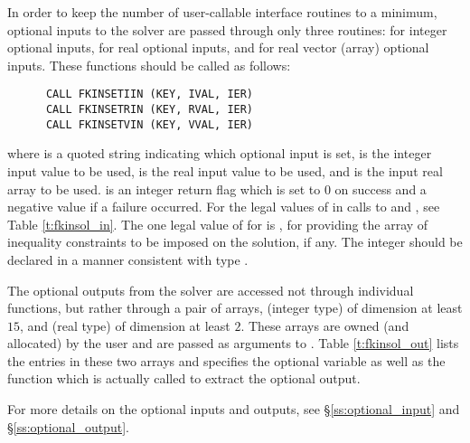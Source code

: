 In order to keep the number of user-callable {\fkinsol} interface routines to
a minimum, optional inputs to the {\kinsol} solver are passed through only three
routines:  for integer optional inputs,  for real
optional inputs, and  for real vector (array) optional inputs.
These functions should be called as follows:
\begin{verbatim}
      CALL FKINSETIIN (KEY, IVAL, IER)
      CALL FKINSETRIN (KEY, RVAL, IER)
      CALL FKINSETVIN (KEY, VVAL, IER)
\end{verbatim}
where  is a quoted string indicating which optional input is set,
 is the integer input value to be used,
 is the real input value to be used, and
 is the input real array to be used.
 is an integer return flag which is set to $0$ on success and
a negative value if a failure occurred.
For the legal values of  in calls to  and ,
see Table \ref{t:fkinsol_in}.  The one legal value of  for 
is , for providing the array of inequality constraints to be
imposed on the solution, if any.
The integer  should be declared in a manner consistent with {\C}
type .

The optional outputs from the {\kinsol} solver are accessed not through
individual functions, but rather through a pair of arrays, 
(integer type) of dimension at least $15$, and  (real type) of
dimension at least $2$.  These arrays are owned (and allocated) by the user
and are passed as arguments to .
Table \ref{t:fkinsol_out} lists the entries in these two arrays and specifies the
optional variable as well as the {\kinsol} function which is actually called to
extract the optional output.

For more details on the optional inputs and outputs, see \S\ref{ss:optional_input}
and \S\ref{ss:optional_output}.

